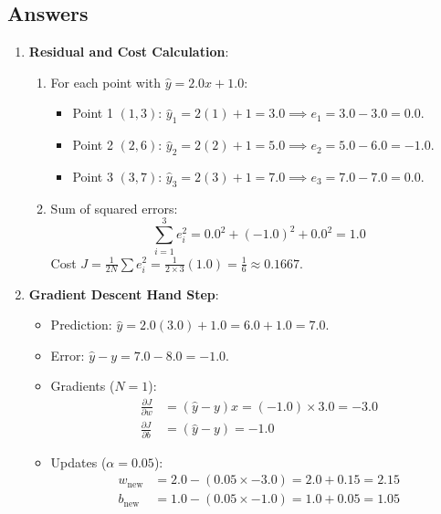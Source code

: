 \subsection*{Answers}

\begin{enumerate}
    \item \textbf{Residual and Cost Calculation}:
    \begin{enumerate}
        \item For each point with $\hat{y} = 2.0x + 1.0$:
        \begin{itemize}
            \item Point 1 $(1, 3)$: $\hat{y}_1 = 2(1) + 1 = 3.0 \implies e_1 = 3.0 - 3.0 = 0.0$.
            \item Point 2 $(2, 6)$: $\hat{y}_2 = 2(2) + 1 = 5.0 \implies e_2 = 5.0 - 6.0 = -1.0$.
            \item Point 3 $(3, 7)$: $\hat{y}_3 = 2(3) + 1 = 7.0 \implies e_3 = 7.0 - 7.0 = 0.0$.
        \end{itemize}
        \item Sum of squared errors:
        \begin{equation*}
        \sum_{i=1}^3 e_i^2 = 0.0^2 + (-1.0)^2 + 0.0^2 = 1.0
        \end{equation*}
        Cost $J = \frac{1}{2N} \sum e_i^2 = \frac{1}{2 \times 3} (1.0) = \frac{1}{6} \approx 0.1667$.
    \end{enumerate}

    \item \textbf{Gradient Descent Hand Step}:
    \begin{itemize}
        \item Prediction: $\hat{y} = 2.0(3.0) + 1.0 = 6.0 + 1.0 = 7.0$.
        \item Error: $\hat{y} - y = 7.0 - 8.0 = -1.0$.
        \item Gradients ($N=1$):
        \begin{align*}
        \frac{\partial J}{\partial w} &= (\hat{y} - y) x = (-1.0) \times 3.0 = -3.0 \\
        \frac{\partial J}{\partial b} &= (\hat{y} - y) = -1.0
        \end{align*}
        \item Updates ($\alpha = 0.05$):
        \begin{align*}
        w_{\text{new}} &= 2.0 - (0.05 \times -3.0) = 2.0 + 0.15 = \mathbf{2.15} \\
        b_{\text{new}} &= 1.0 - (0.05 \times -1.0) = 1.0 + 0.05 = \mathbf{1.05}
        \end{align*}
    \end{itemize}


\end{enumerate}
